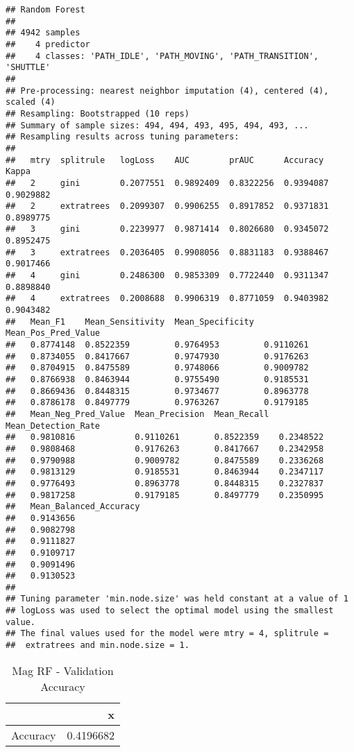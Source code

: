 \documentclass[]{article}
\begin{document}
\begin{verbatim}
## Random Forest 
## 
## 4942 samples
##    4 predictor
##    4 classes: 'PATH_IDLE', 'PATH_MOVING', 'PATH_TRANSITION', 'SHUTTLE' 
## 
## Pre-processing: nearest neighbor imputation (4), centered (4), scaled (4) 
## Resampling: Bootstrapped (10 reps) 
## Summary of sample sizes: 494, 494, 493, 495, 494, 493, ... 
## Resampling results across tuning parameters:
## 
##   mtry  splitrule   logLoss    AUC        prAUC      Accuracy   Kappa    
##   2     gini        0.2077551  0.9892409  0.8322256  0.9394087  0.9029882
##   2     extratrees  0.2099307  0.9906255  0.8917852  0.9371831  0.8989775
##   3     gini        0.2239977  0.9871414  0.8026680  0.9345072  0.8952475
##   3     extratrees  0.2036405  0.9908056  0.8831183  0.9388467  0.9017466
##   4     gini        0.2486300  0.9853309  0.7722440  0.9311347  0.8898840
##   4     extratrees  0.2008688  0.9906319  0.8771059  0.9403982  0.9043482
##   Mean_F1    Mean_Sensitivity  Mean_Specificity  Mean_Pos_Pred_Value
##   0.8774148  0.8522359         0.9764953         0.9110261          
##   0.8734055  0.8417667         0.9747930         0.9176263          
##   0.8704915  0.8475589         0.9748066         0.9009782          
##   0.8766938  0.8463944         0.9755490         0.9185531          
##   0.8669436  0.8448315         0.9734677         0.8963778          
##   0.8786178  0.8497779         0.9763267         0.9179185          
##   Mean_Neg_Pred_Value  Mean_Precision  Mean_Recall  Mean_Detection_Rate
##   0.9810816            0.9110261       0.8522359    0.2348522          
##   0.9808468            0.9176263       0.8417667    0.2342958          
##   0.9790988            0.9009782       0.8475589    0.2336268          
##   0.9813129            0.9185531       0.8463944    0.2347117          
##   0.9776493            0.8963778       0.8448315    0.2327837          
##   0.9817258            0.9179185       0.8497779    0.2350995          
##   Mean_Balanced_Accuracy
##   0.9143656             
##   0.9082798             
##   0.9111827             
##   0.9109717             
##   0.9091496             
##   0.9130523             
## 
## Tuning parameter 'min.node.size' was held constant at a value of 1
## logLoss was used to select the optimal model using the smallest value.
## The final values used for the model were mtry = 4, splitrule =
##  extratrees and min.node.size = 1.
\end{verbatim}

\begin{table}[!h]

\caption{\label{tab:mag-rf-results}Mag RF - Validation Accuracy}
\centering
\begin{tabular}[t]{lr}
\toprule
  & x\\
\midrule
Accuracy & 0.4196682\\
\bottomrule
\end{tabular}
\end{table}
\end{document}
